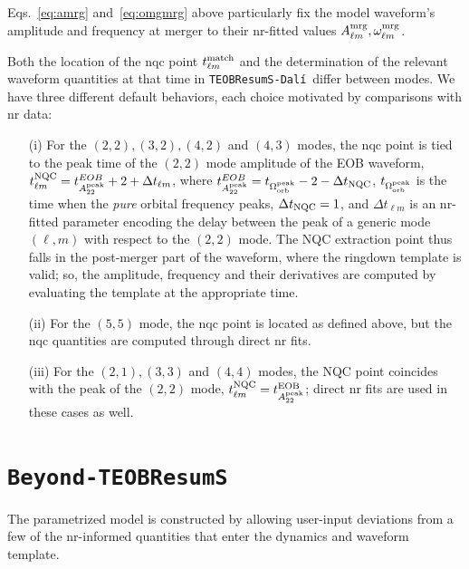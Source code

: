 \documentclass[prd,amssymb,amsmath,amsfonts,nofootinbib,reprint,showpacs,longbibliography]{revtex4-1}
\def\TEOBResumSDali{\texttt{TEOBResumS-Dalí}}
\def\TEOBB{\texttt{Beyond-TEOBResumS}}
\newcommand{\amrg}[1]{{A_{#1}^{\rm mrg}}}
\newcommand{\omgmrg}[1]{{\omega_{#1}^{\rm mrg}}}
\begin{document}
Eqs.~\eqref{eq:amrg} and~\eqref{eq:omgmrg} above particularly fix the model waveform's amplitude and
frequency at merger to their \ac{nr}-fitted values $\amrg{\ell m}, \omgmrg{\ell m}$.

Both the location of the \ac{nqc} point $t_{\ell m}^{\rm match}$ and the determination
of the relevant waveform quantities at that time in \TEOBResumSDali~differ between modes.
We have three different default behaviors, each choice motivated by comparisons with
\ac{nr} data:
\begin{itemize}
\item[(i)] For the $(2,2), (3,2), (4,2)$ and $(4,3)$ modes, the \ac{nqc} point is tied to the peak time of the $(2,2)$
mode amplitude of the EOB waveform, $t_{\ell m}^{\rm NQC} = t_{A_{22}^{\rm peak}}^{EOB} + 2 + \Delta t_{\ell m}$, 
where $t_{A_{22}^{\rm peak}}^{EOB} = t_{\Omega_{\rm orb}^{\rm peak}} - 2 - \Delta t_{\rm NQC}$, $t_{\Omega_{\rm orb}^{\rm peak}}$
is the time when the \textit{pure} orbital frequency peaks, $\Delta t_{\rm NQC} = 1$, and $\Delta t_{\ell m}$ is an \ac{nr}-fitted parameter
encoding the delay between the peak of a generic mode $(\ell, m)$ with respect to the $(2,2)$ mode.
The NQC extraction point thus falls in the post-merger part of the waveform, where the ringdown
template is valid; so, the amplitude, frequency and their derivatives are computed by evaluating the
template at the appropriate time.
\item[(ii)] For the $(5,5)$ mode, the \ac{nqc} point is located as defined above, but the \ac{nqc} quantities
are computed through direct \ac{nr} fits.
\item[(iii)] For the $(2,1), (3,3)$ and $(4,4)$ modes, the NQC point coincides
with the peak of the $(2,2)$ mode, $t_{\ell m}^{\rm NQC} = t_{A_{22}^{\rm peak}}^{\rm EOB}$; direct \ac{nr} fits 
are used in these cases as well.
\end{itemize}

\section{\TEOBB}
The parametrized model is constructed by allowing user-input deviations from a few of the \ac{nr}-informed quantities
that enter the dynamics and waveform template.
\end{document}
